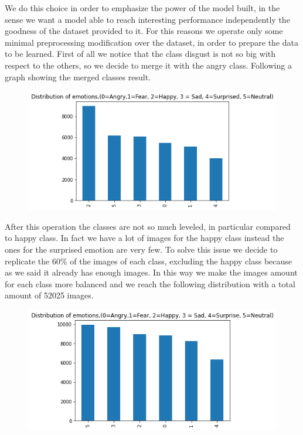 \documentclass[10pt,twocolumn,letterpaper]{article}
\begin{document}
We do this choice in order to emphasize the power of the model built, in the sense we want a model able to reach interesting performance independently
the goodness of the dataset provided to it.
For this reasons we operate only some minimal preprocessing modification over the dataset, in order to prepare the data to be learned.
First of all we notice that the class disgust is not so big with respect to the others, so we decide to merge it with the angry class.
Following a graph showing the merged classes result.
\begin{figure}[H]
   \centering
   \includegraphics[width=1\linewidth]{./immagini/6_classi.png}
\end{figure}
After this operation the classes are not so much leveled, in particular compared to happy class.
In fact we have a lot of images for the happy class instead the ones for the surprised emotion are very few.
To solve this issue we decide to replicate the 60\% of the images of each class, excluding the happy class because as we said it already has enough images.
In this way we make the images amount for each class more balanced and we reach the following distribution with a total amount of 52025 images.
\begin{figure}[H]
   \centering
   \includegraphics[width=1\linewidth]{./immagini/classi_bilanciate.png}
\end{figure}
\end{document}

